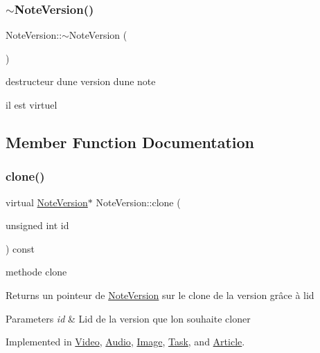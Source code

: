 \subsubsection{\texorpdfstring{$\sim$\+Note\+Version()}{~NoteVersion()}}
{\footnotesize\ttfamily Note\+Version\+::$\sim$\+Note\+Version (\begin{DoxyParamCaption}{ }\end{DoxyParamCaption})\hspace{0.3cm}{\ttfamily [virtual]}}



destructeur d\textquotesingle{}une version d\textquotesingle{}une note 

il est virtuel 

\subsection{Member Function Documentation}
\mbox{\label{class_note_version_a7eb23a52291ec623b9bc1b6fe3e86c5a}} 
\subsubsection{\texorpdfstring{clone()}{clone()}}
{\footnotesize\ttfamily virtual \hyperlink{class_note_version}{Note\+Version}$\ast$ Note\+Version\+::clone (\begin{DoxyParamCaption}\item[{unsigned int}]{id }\end{DoxyParamCaption}) const\hspace{0.3cm}{\ttfamily [pure virtual]}}



methode clone 

\begin{DoxyReturn}{Returns}
un pointeur de \hyperlink{class_note_version}{Note\+Version} sur le clone de la version grâce à l\textquotesingle{}id 
\end{DoxyReturn}

\begin{DoxyParams}{Parameters}
{\em id} & L\textquotesingle{}id de la version que l\textquotesingle{}on souhaite cloner \\
\hline
\end{DoxyParams}


Implemented in \hyperlink{class_video_a505ceb0063f73cf8dd06bc6c6ff72c5d}{Video}, \hyperlink{class_audio_ae389c3ddd81187769876a1b1790be587}{Audio}, \hyperlink{class_image_a31a754ded7599e3f1a9b83bdcc4437c0}{Image}, \hyperlink{class_task_a1bbd4cedca0617ce64237e90af5a797a}{Task}, and \hyperlink{class_article_a78188a4d3c5b071caf13db46ecdc32b9}{Article}.

